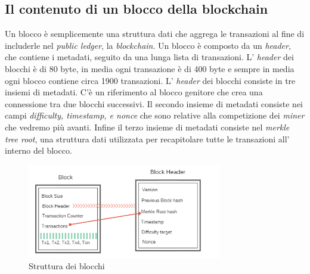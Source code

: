 \subsection{Il contenuto di un blocco della blockchain}
Un blocco \`e semplicemente una struttura dati che aggrega le transazioni al fine di includerle nel \textit{public ledger}, la \textit{blockchain}. Un blocco \`e composto da un \textit{header}, che contiene i metadati, seguito da una lunga lista di transazioni. L' \textit{header} dei blocchi \`e di 80 byte, in media ogni transazione \`e di 400 byte e sempre in media ogni blocco contiene circa 1900 transazioni.
L' \textit{header} dei blocchi consiste in tre insiemi di metadati. C'\`e un riferimento al blocco genitore che crea una connessione tra due blocchi successivi. Il secondo insieme di metadati consiste nei campi \textit{difficulty, timestamp, e nonce} che sono relative alla competizione dei \textit{miner} che vedremo pi\`u avanti. Infine il terzo insieme di metadati consiste nel \textit{merkle tree root}, una struttura dati utilizzata per recapitolare tutte le transazioni all' interno del blocco.
\begin{figure}[htb]
\begin{center}
   \includegraphics[width=0.755\textwidth]{imgs/block.png}
   \caption{Struttura dei blocchi }
   \end{center}
   \hfill
\end{figure}



